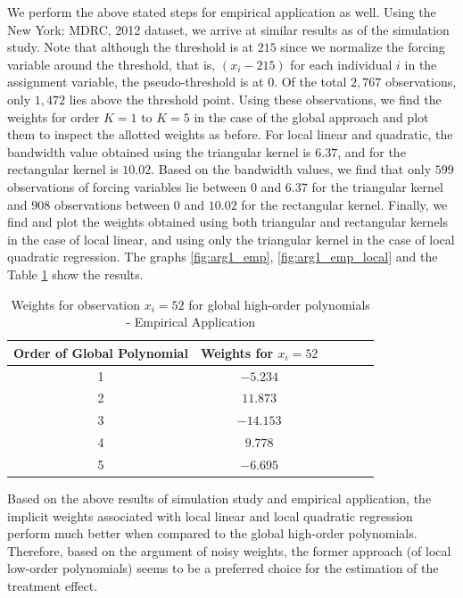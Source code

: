 \documentclass[fleqn]{article}
\begin{document}
    We perform the above stated steps for empirical application as well. Using the New York: MDRC, 2012\cite{jacob2012practical} dataset, we arrive at similar results as of the simulation study. Note that although the threshold is at $215$ since we normalize the forcing variable around the threshold, that is, $(x_{i} - 215)$ for each individual $i$ in the assignment variable, the pseudo-threshold is at $0$. Of the total $2,767$ observations, only $1,472$ lies above the threshold point. Using these observations, we find the weights for order $K=1$ to $K=5$ in the case of the global approach and plot them to inspect the allotted weights as before. For local linear and quadratic, the bandwidth value obtained using the triangular kernel is $6.37$, and for the rectangular kernel is $10.02$. Based on the bandwidth values, we find that only $599$ observations of forcing variables lie between $0$ and $6.37$ for the triangular kernel and $908$ observations between $0$ and $10.02$ for the rectangular kernel. Finally, we find and plot the weights obtained using both triangular and rectangular kernels in the case of local linear, and using only the triangular kernel in the case of local quadratic regression. The graphs \ref{fig:arg1_emp}, \ref{fig:arg1_emp_local} and the Table \ref{arg1_table_emp} show the results.\\

    \begin{table}
    \centering
    \caption{Weights for observation $x_{i} = 52$ for global high-order polynomials - Empirical Application}
    \label{arg1_table_emp}
        \begin{tabular}{cccccc}\\
            \hline
            Order of Global Polynomial & Weights for $x_{i} = 52$\\
            \hline
            1 & $-5.234$\\
            2 & $11.873$\\
            3 & $-14.153$\\
            4 & $9.778$\\
            5 & $-6.695$\\
            \hline
        \end{tabular} 
    \end{table} 

    Based on the above results of simulation study and empirical application, the implicit weights associated with local linear and local quadratic regression perform much better when compared to the global high-order polynomials. Therefore, based on the argument of noisy weights, the former approach (of local low-order polynomials) seems to be a preferred choice for the estimation of the treatment effect.\\
\end{document}
